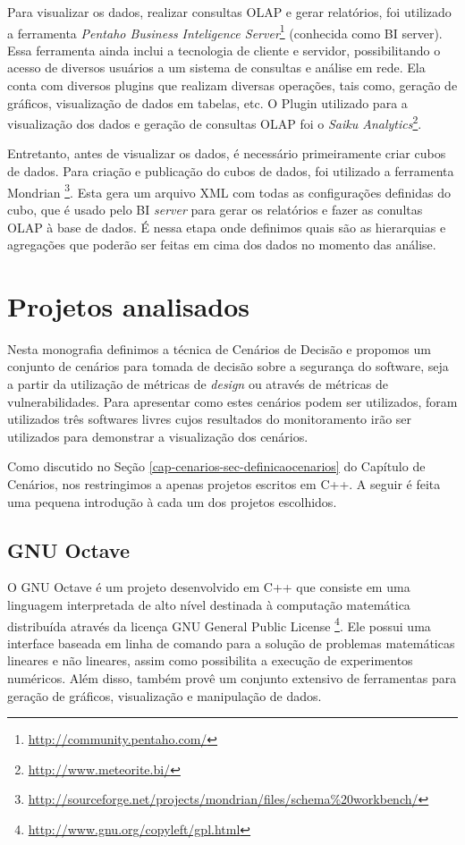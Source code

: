 Para visualizar os dados, realizar consultas OLAP e gerar relatórios, foi utilizado a ferramenta \emph{Pentaho Business Inteligence Server}\footnote{\url{http://community.pentaho.com/}} (conhecida como BI server). Essa ferramenta ainda inclui a tecnologia de cliente e servidor, possibilitando o acesso de diversos usuários a um sistema de consultas e análise em rede. Ela conta com diversos plugins que realizam diversas operações, tais como, geração de gráficos, visualização de dados em tabelas, etc. O Plugin utilizado para a visualização dos dados e geração de consultas OLAP foi o \emph{Saiku Analytics}\footnote{\url{http://www.meteorite.bi/}}.

Entretanto, antes de visualizar os dados, é necessário primeiramente criar cubos de dados. Para criação e publicação do cubos de dados, foi utilizado a ferramenta Mondrian \footnote{\url{http://sourceforge.net/projects/mondrian/files/schema\%20workbench/}}. Esta gera um arquivo XML com todas as configurações definidas do cubo, que é usado pelo BI \emph{server} para gerar os relatórios e fazer as conultas OLAP à base de dados. É nessa etapa onde definimos quais são as hierarquias e agregações que poderão ser feitas em cima dos dados no momento das análise.



\section{Projetos analisados}
\label{cap-projects}

Nesta monografia definimos a técnica de Cenários de Decisão e propomos um conjunto de cenários para tomada de decisão sobre a segurança do software, seja a partir da utilização de métricas de \emph{design} ou através de métricas de vulnerabilidades. Para apresentar como estes cenários podem ser utilizados, foram utilizados três softwares livres cujos resultados do monitoramento irão ser utilizados para demonstrar a visualização dos cenários.

Como discutido no Seção \ref{cap-cenarios-sec-definicaocenarios} do Capítulo de Cenários, nos restringimos a apenas projetos escritos em C++. A seguir é feita uma pequena introdução à cada um dos projetos escolhidos.

\subsection{GNU Octave}
\label{section-octave}

O GNU Octave é um projeto desenvolvido em C++ que consiste em uma linguagem interpretada de alto nível destinada à computação matemática distribuída através da licença GNU General Public License \footnote{\url{http://www.gnu.org/copyleft/gpl.html}}. Ele possui uma interface baseada em linha de comando para a solução de problemas matemáticas lineares e não lineares, assim como possibilita a execução de experimentos numéricos. Além disso, também provê um conjunto extensivo de ferramentas para geração de gráficos, visualização e manipulação de dados.


